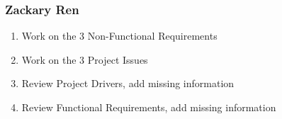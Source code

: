 \documentclass[11pt, oneside]{article}   	%
\begin{document}
\subsubsection*{Zackary Ren}
\begin{enumerate}
\item Work on the 3 Non-Functional Requirements
\item Work on the 3 Project Issues
\item Review Project Drivers, add missing information
\item Review Functional Requirements, add missing information
\end{enumerate}
\end{document}
